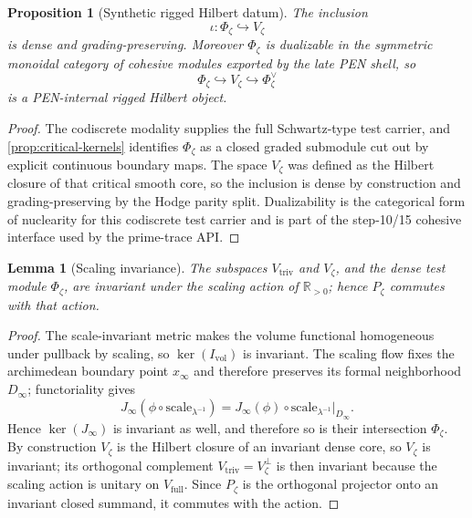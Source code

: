 \documentclass[11pt,a4paper]{article}
\theoremstyle{plain}
\newtheorem{lemma}[theorem]{Lemma}
\newtheorem{proposition}[theorem]{Proposition}
\theoremstyle{definition}
\newcommand{\R}{\mathbb{R}}
\newcommand{\triv}{\mathrm{triv}}
\begin{document}
\begin{proposition}[Synthetic rigged Hilbert datum]
\label{prop:rigged}
The inclusion
\[
  \iota:\Phi_{\zeta}\hookrightarrow V_{\zeta}
\]
is dense and grading-preserving. Moreover $\Phi_{\zeta}$ is dualizable in the symmetric monoidal category of cohesive modules exported by the late PEN shell, so
\[
  \Phi_{\zeta}\hookrightarrow V_{\zeta}\hookrightarrow \Phi_{\zeta}^{\vee}
\]
is a PEN-internal rigged Hilbert object.
\end{proposition}

\begin{proof}
The codiscrete modality supplies the full Schwartz-type test carrier, and \cref{prop:critical-kernels} identifies $\Phi_{\zeta}$ as a closed graded submodule cut out by explicit continuous boundary maps. The space $V_{\zeta}$ was defined as the Hilbert closure of that critical smooth core, so the inclusion is dense by construction and grading-preserving by the Hodge parity split. Dualizability is the categorical form of nuclearity for this codiscrete test carrier and is part of the step-10/15 cohesive interface used by the prime-trace API.
\end{proof}

\begin{lemma}[Scaling invariance]
\label{lem:Pinvariant}
The subspaces $V_{\triv}$ and $V_{\zeta}$, and the dense test module $\Phi_{\zeta}$, are invariant under the scaling action of $\R_{>0}$; hence $P_{\zeta}$ commutes with that action.
\end{lemma}

\begin{proof}
The scale-invariant metric makes the volume functional homogeneous under pullback by scaling, so $\ker(I_{\mathrm{vol}})$ is invariant. The scaling flow fixes the archimedean boundary point $x_{\infty}$ and therefore preserves its formal neighborhood $D_{\infty}$; functoriality gives
\[
  J_{\infty}(\phi\circ \mathrm{scale}_{\lambda^{-1}})
  =
  J_{\infty}(\phi)\circ \mathrm{scale}_{\lambda^{-1}}\big|_{D_{\infty}}.
\]
Hence $\ker(J_{\infty})$ is invariant as well, and therefore so is their intersection $\Phi_{\zeta}$. By construction $V_{\zeta}$ is the Hilbert closure of an invariant dense core, so $V_{\zeta}$ is invariant; its orthogonal complement $V_{\triv}=V_{\zeta}^{\perp}$ is then invariant because the scaling action is unitary on $V_{\mathrm{full}}$. Since $P_{\zeta}$ is the orthogonal projector onto an invariant closed summand, it commutes with the action.
\end{proof}
\end{document}
